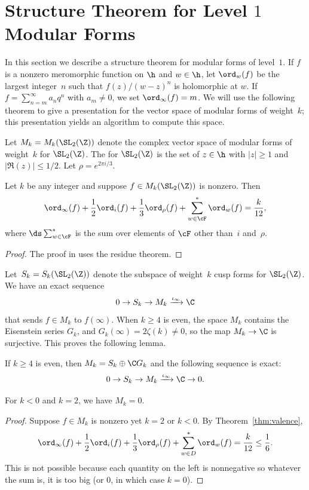 \section{Structure Theorem for Level $1$ Modular  Forms}\label{sec:struct1}
In this section we describe a structure theorem for modular
forms of level~$1$. 
If $f$ is a nonzero meromorphic function on $\h$ and $w\in\h$, let
$\ord_w(f)$ be the largest integer~$n$ such that $f(z)/(w-z)^n$ is
holomorphic at $w$.  If $f = \sum_{n=m}^{\infty} a_n q^n$ with
$a_m\neq 0$, we set $\ord_{\infty}(f)=m$.  We will use the following
theorem to give a presentation for the vector space of modular forms
of weight~$k$; this presentation yields an algorithm
to compute this space.

Let $M_k=M_k(\SL_2(\Z))$ denote the complex vector space of modular
forms of weight~$k$ for $\SL_2(\Z)$.
The  \sym{\cF} for $\SL_2(\Z)$
is the set of $z\in \h$  with $|z|\geq 1$ and
$|\Re(z)|\leq 1/2$.  
Let $\rho = e^{2\pi i /3}$.

\begin{theorem}\label{thm:valence}
Let $k$ be any integer and
suppose $f \in M_k(\SL_2(\Z))$ is nonzero.  Then
$$
  \ord_{\infty}(f) + \frac{1}{2}\ord_i(f) + \frac{1}{3} \ord_{\rho}(f)
   + \sum_{w\in \cF}^* \ord_w(f) = \frac{k}{12},
$$
where $\ds \sum^*_{w \in \cF}$ is the sum over elements of $\cF$
other than~$i$ and~$\rho$.
\end{theorem}
\begin{proof}
The proof in \cite[\S{}VII.3]{serre:arithmetic} uses
the residue theorem.
\end{proof}

Let~$S_k=S_k(\SL_2(\Z))$
denote the subspace of weight~$k$ cusp forms for $\SL_2(\Z)$.  We have
an exact sequence
$$
  0 \to S_k \to M_k \xrightarrow{\iota_\infty} \C 
$$
that sends $f\in M_k$ to $f(\infty)$.  When $k\geq 4$ is even, the
space $M_k$ contains the Eisenstein series $G_k$, and
$G_k(\infty)=2\zeta(k)\neq 0$, so the map $M_k\to \C$ is surjective.
This proves the following lemma.
\begin{lemma}
If $k\geq 4$ is even, then $
  M_k = S_k \oplus \C G_k
$
and the following sequence is exact:
$$
  0 \to S_k \to M_k \xrightarrow{\iota_\infty} \C  \to 0.
$$
\end{lemma}

\begin{proposition}\label{prop:mk_vanish}
For $k<0$ and $k=2$, we have $M_k=0$.  
\end{proposition}
\begin{proof}
Suppose $f\in M_k$ is nonzero yet $k=2$ or $k<0$.  By 
Theorem~\ref{thm:valence}, 
$$
  \ord_{\infty}(f) + \frac{1}{2}\ord_i(f) + \frac{1}{3} \ord_{\rho}(f)
   + \sum_{w\in D}^* \ord_w(f) = \frac{k}{12}\leq \frac{1}{6}.
$$
This is not possible because each quantity on the left is nonnegative so
whatever the sum is, it is too big (or $0$, in which case $k=0$).
\end{proof}

